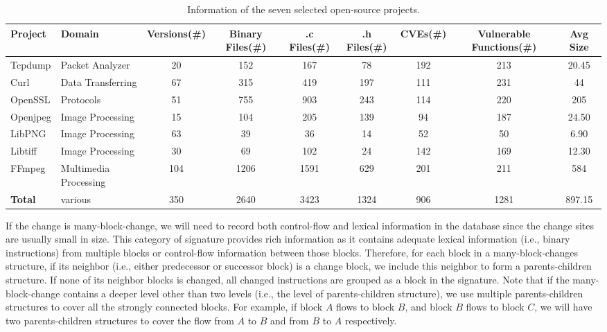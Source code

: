 \begin{table*}[!t]
\centering
\caption{Information of the seven selected open-source projects.}
\label{tab:projects}
\footnotesize
\begin{tabular}{l|l|c|c|c|c|c|c|c}
\hline
\textbf{Project} & \textbf{Domain} &\textbf{Versions(\#)} & \textbf{Binary Files(\#)} & \textbf{.c Files(\#)} & \textbf{.h Files(\#)} & \textbf{CVEs(\#)} & \textbf{Vulnerable Functions(\#)} & \textbf{Avg Size}\\
 \hline
Tcpdump &Packet Analyzer& 20 &152 &167 &78 &192 &213 &20.45 \\

Curl &Data Transferring&  67 &315 &419 &197 &111 &231 &44 \\

OpenSSL &Protocols& 51 &755 &903 &243 &114 &220 &205 \\

Openjpeg &Image Processing&  15 &104 &205 &139 &94 &187 &24.50 \\

LibPNG &Image Processing& 63 &39 &36 &14 &52 &50 &6.90 \\

Libtiff &Image Processing& 30 &69 &102 &24 &142 &169 &12.30 \\

FFmpeg &Multimedia Processing& 104 &1206 &1591 &629 &201 &211 &584 \\

\hline
\textbf{Total} & various & 350 &2640 &3423 &1324 &906 &1281 &897.15 \\
\hline
\end{tabular}
\end{table*}



If the change is many-block-change, we will need to record both control-flow and lexical information in the database since the change sites are usually small in size. This category of signature provides rich information as it contains adequate lexical information (i.e., binary instructions) from multiple blocks or control-flow information between those blocks. 
Therefore, for each block in a many-block-changes structure, if its neighbor (i.e., either predecessor or successor block) is a change block, we include this neighbor to form a parents-children structure. 
If none of its neighbor blocks is changed, all changed instructions are grouped as a block in the signature. Note that if the many-block-change contains a deeper level other than two levels (i.e., the level of parents-children structure), we use multiple parents-children structures to cover all the strongly connected blocks. For example, if block $A$ flows to block $B$, and block $B$ flows to block $C$, we will have two parents-children structures to cover the flow from $A$ to $B$ and from $B$ to $A$ respectively.

